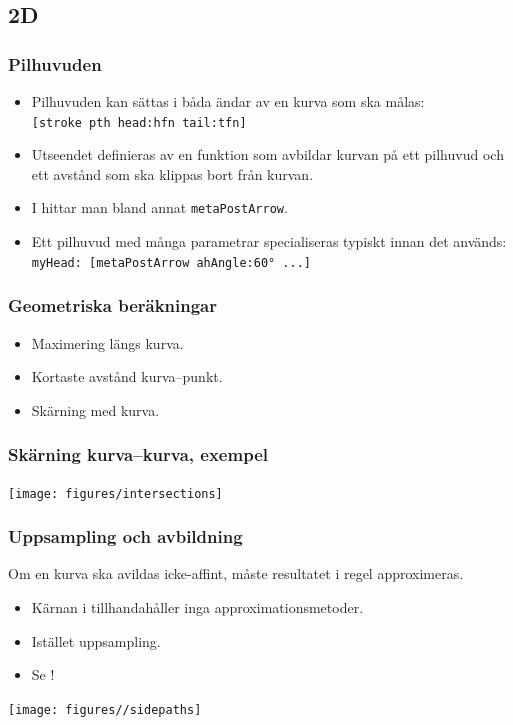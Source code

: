 \documentclass[noamsthm,handout]{beamer}
\begin{document}
\subsection{2D}
\begin{frame}\frametitle{Pilhuvuden}
  \begin{itemize}
  \item Pilhuvuden kan sättas i båda ändar av en kurva som ska målas:\\
    \texttt{[stroke pth head:hfn tail:tfn]}
  \item Utseendet definieras av en funktion som avbildar kurvan på ett pilhuvud och ett avstånd som ska klippas bort från kurvan.
  \item I  hittar man bland annat \texttt{metaPostArrow}.
  \item Ett pilhuvud med många parametrar specialiseras typiskt innan det används:\\
    \texttt{myHead: [metaPostArrow ahAngle:60° ...]}
  \end{itemize}
\end{frame}
\begin{frame}\frametitle{Geometriska beräkningar}
  \begin{itemize}
  \item Maximering längs kurva.
  \item Kortaste avstånd kurva--punkt.
  \item Skärning med kurva.
  \end{itemize}
\end{frame}
\begin{frame}\frametitle{Skärning kurva--kurva, exempel}
  \begin{center}
    \texttt{[image: figures/intersections]}
  \end{center}
\end{frame}
\begin{frame}\frametitle{Uppsampling och avbildning}
  Om en kurva ska avildas icke-affint, måste resultatet i regel approximeras.
  \begin{itemize}
  \item Kärnan i \Shapes tillhandahåller inga approximationsmetoder.
  \item Istället uppsampling.
  \item Se !
  \end{itemize}
  \begin{center}
    \texttt{[image: figures//sidepaths]}
  \end{center}
\end{frame}
\end{document}
